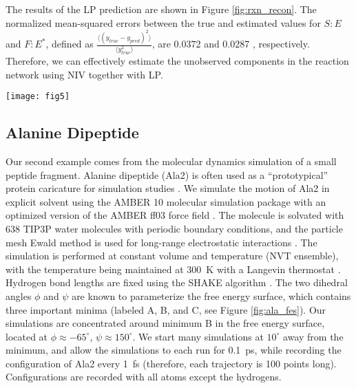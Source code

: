 \documentclass[aip,jcp,preprint]{revtex4-1}
\begin{document}
The results of the LP prediction are shown in Figure \ref{fig:rxn_recon}.
%
The normalized mean-squared errors between the true and estimated values for $S:E$ and $F:E^{*}$, defined as $\frac{\langle (y_{true}-y_{pred})^2 \rangle}{\langle y_{true}^2 \rangle}$, are 0.0372 and 0.0287 , respectively.
%
Therefore, we can effectively estimate the unobserved components in the reaction network using NIV together with LP.
%


\begin{figure*}[ht]
    \texttt{[image: fig5]}
    \caption{LP reconstructions of (a) $S:E$ and (b) $F:E^{*}$ for $\mathcal{Y}_2$, using $\mathcal{Y}_1$ as training data.}
    \label{fig:rxn_recon}
\end{figure*}

\subsection{Alanine Dipeptide}

Our second example comes from the molecular dynamics simulation of a small peptide fragment.
%
Alanine dipeptide (Ala2) is often used as a ``prototypical'' protein caricature for simulation studies
\cite{apostolakis1999calculation, bolhuis2000reaction, chekmarev2004long, ma2005automatic, frewen2009exploration, ferguson2011integrating}.
%
We simulate the motion of Ala2 in explicit solvent using the AMBER 10 molecular simulation package \cite{case2008Amber} with an
optimized version \cite{best2009optimized} of the AMBER ff03 force field \cite{duan2003point}.
%
The molecule is solvated with 638 TIP3P water molecules \cite{jorgensen1983comparison}
with periodic boundary conditions, and the particle mesh Ewald method is used for long-range electrostatic interactions \cite{essmann1995smooth}.
%
The simulation is performed at constant volume and temperature (NVT ensemble), with the temperature being maintained at 300~K with a Langevin thermostat \cite{loncharich1992langevin}.
%
Hydrogen bond lengths are fixed using the SHAKE algorithm \cite{ryckaert1977numerical}.
%
The two dihedral angles $\phi$ and $\psi$ are known to parameterize the free energy surface, which contains three important minima (labeled A, B, and C, see Figure \ref{fig:ala_fes}).
%
Our simulations are concentrated around minimum B in the free energy surface, located at $\phi \approx -65^{\circ}$, $\psi \approx 150^{\circ}$.
%
We start many simulations at $10^{\circ}$ away from the minimum, and allow the simulations to each run for 0.1~ps, while recording the configuration of Ala2 every 1~fs (therefore, each trajectory is 100 points long).
%
Configurations are recorded with all atoms except the hydrogens.
\end{document}
